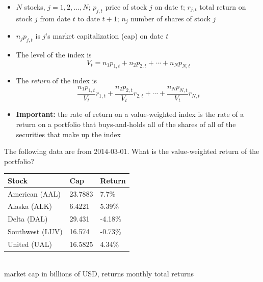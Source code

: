 \documentclass{beamer}
\begin{document}
\begin{frame}{}
	\begin{itemize}
		\item $N$ stocks, $j=1,2,\ldots,N$; $p_{j,t}$ price of stock $j$ on date $t$; $r_{j,t}$ total return on stock $j$ from date $t$ to date $t+1$; $n_{j}$ number of shares of stock $j$
		\item $n_{j}p_{j,t}$ is $j$'s market capitalization (cap) on date $t$ 
		\item The level of the index is
			\begin{equation*}
				V_{t}=n_{1}p_{1,t}+n_{2}p_{2,t}+\cdots+n_{N}p_{N,t}
			\end{equation*}
		\item The \textit{return} of the index is
			\begin{equation*}
				\frac{n_{1}p_{1,t}}{V_{t}}r_{1,t}+\frac{n_{2}p_{2,t}}{V_{t}}r_{2,t}+\cdots+\frac{n_{N}p_{N,t}}{V_{t}}r_{N,t}
			\end{equation*}
		\item\textbf{Important:} the rate of return on a value-weighted index is the rate of a return on a portfolio that buys-and-holds all of the shares of all of the securities that make up the index
	\end{itemize}
\end{frame}

\begin{frame}{}
	The following data are from 2014-03-01. What is the value-weighted return of the portfolio?
	\begin{center}
		\begin{tabular}{l|ll}
			\textbf{Stock} & \textbf{Cap} & \textbf{Return} \\ \hline
			American (AAL) & 23.7883 & 7.7\% \\
			Alaska (ALK) & 6.4221 & 5.39\% \\
			Delta (DAL) & 29.431 & -4.18\% \\
			Southwest (LUV) & 16.574 & -0.73\% \\
			United (UAL) & 16.5825 & 4.34\%\\\hline
		\end{tabular}\\
		{\footnotesize market cap in billions of USD, returns monthly total returns}
	\end{center}
\end{frame}
\end{document}

